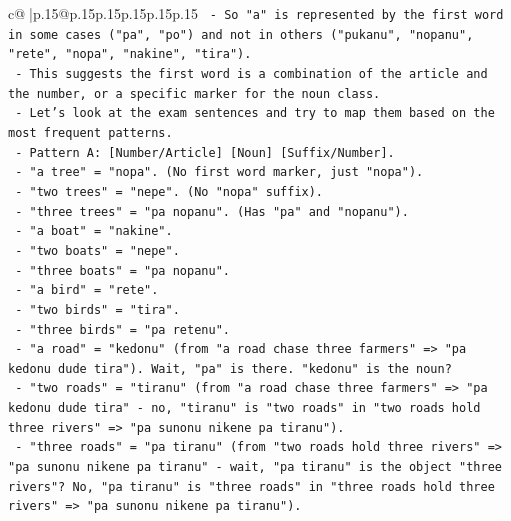 \documentclass{article}
\begin{document}
{\begin{supertabular}{c@{$\;$}|p{.15\linewidth}@{}p{.15\linewidth}p{.15\linewidth}p{.15\linewidth}p{.15\linewidth}p{.15\linewidth}}
{{{\texttt{                           {-} So "a" is represented by the first word in some cases ("pa", "po") and not in others ("pukanu", "nopanu", "rete", "nopa", "nakine", "tira").} \\
\texttt{                           {-} This suggests the first word is a combination of the article and the number, or a specific marker for the noun class.} \\
\texttt{                           {-} Let's look at the exam sentences and try to map them based on the most frequent patterns.} \\
\texttt{                           {-} Pattern A: {[}Number/Article{]} {[}Noun{]} {[}Suffix/Number{]}.} \\
\texttt{                             {-} "a tree" = "nopa". (No first word marker, just "nopa").} \\
\texttt{                             {-} "two trees" = "nepe". (No "nopa" suffix).} \\
\texttt{                             {-} "three trees" = "pa nopanu". (Has "pa" and "nopanu").} \\
\texttt{                             {-} "a boat" = "nakine".} \\
\texttt{                             {-} "two boats" = "nepe".} \\
\texttt{                             {-} "three boats" = "pa nopanu".} \\
\texttt{                             {-} "a bird" = "rete".} \\
\texttt{                             {-} "two birds" = "tira".} \\
\texttt{                             {-} "three birds" = "pa retenu".} \\
\texttt{                             {-} "a road" = "kedonu" (from "a road chase three farmers" => "pa kedonu dude tira"). Wait, "pa" is there. "kedonu" is the noun?} \\
\texttt{                             {-} "two roads" = "tiranu" (from "a road chase three farmers" => "pa kedonu dude tira" {-} no, "tiranu" is "two roads" in "two roads hold three rivers" => "pa sunonu nikene pa tiranu").} \\
\texttt{                             {-} "three roads" = "pa tiranu" (from "two roads hold three rivers" => "pa sunonu nikene pa tiranu" {-} wait, "pa tiranu" is the object "three rivers"? No, "pa tiranu" is "three roads" in "three roads hold three rivers" => "pa sunonu nikene pa tiranu").} \\
}}}
\end{supertabular}}
\end{document}
